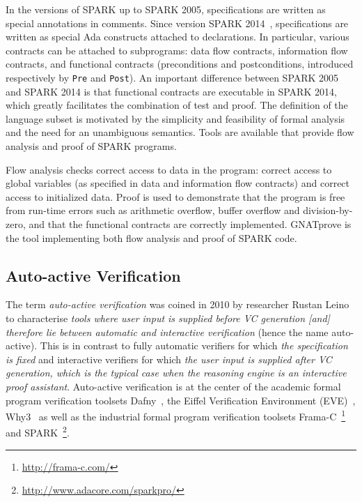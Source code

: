 \documentclass{llncs}
\newcommand{\gnatprove}{GNATprove\xspace}
\newcommand{\spark}{SPARK\xspace}
\begin{document}
In the versions of \spark up to \spark 2005, specifications are written as
special annotations in comments. Since version \spark 2014~\cite{mccormick15},
specifications are written as special Ada constructs attached to
declarations. In particular, various contracts can be attached to subprograms:
data flow contracts, information flow contracts, and functional contracts
(preconditions and postconditions, introduced respectively by \texttt{Pre} and
\texttt{Post}). An important difference between \spark 2005 and \spark 2014 is
that functional contracts are executable in \spark 2014, which greatly
facilitates the combination of test and proof. The definition of the
language subset is motivated by the simplicity and feasibility of formal
analysis and the need for an unambiguous semantics. Tools are available that
provide flow analysis and proof of \spark programs.

Flow analysis checks correct access to data in the program: correct access to
global variables (as specified in data and information flow contracts) and
correct access to initialized data. Proof is used to demonstrate that the
program is free from run-time errors such as arithmetic overflow, buffer
overflow and division-by-zero, and that the functional contracts are correctly
implemented. \gnatprove is the tool implementing both flow analysis and proof
of SPARK code.

\subsection{Auto-active Verification}
\label{sec-prelim-auto-active}

The term \emph{auto-active verification} was coined in 2010 by researcher
Rustan Leino~\cite{Leino10usableauto-active} to characterise \textit{tools where
  user input is supplied before VC generation [and] therefore lie between
  automatic and interactive verification} (hence the name auto-active). This is
in contrast to fully automatic verifiers for which \textit{the specification is
  fixed} and interactive verifiers for which \textit{the user input is supplied
  after VC generation, which is the typical case when the reasoning engine is
  an interactive proof assistant}. Auto-active verification is at the center of
the academic formal program verification toolsets Dafny~\cite{Leino2010Dafny},
the Eiffel Verification Environment (EVE)~\cite{Furia2016},
Why3~\cite{filliatre2013Why3} as well as the industrial formal program
verification toolsets Frama-C~\footnote{\url{http://frama-c.com/}} and
\spark~\footnote{\url{http://www.adacore.com/sparkpro/}}.
\end{document}
